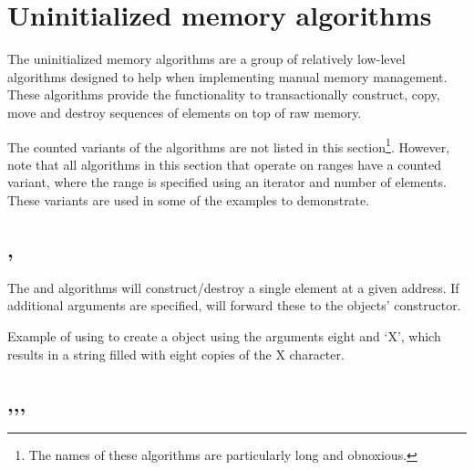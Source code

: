 \section{Uninitialized memory algorithms}

The uninitialized memory algorithms are a group of relatively low-level algorithms designed to help when implementing manual memory management. These algorithms provide the functionality to transactionally construct, copy, move and destroy sequences of elements on top of raw memory.


The counted variants of the algorithms are not listed in this section\footnote{The names of these algorithms are particularly long and obnoxious.}. However, note that all algorithms in this section that operate on ranges have a counted variant, where the range is specified using an iterator and number of elements. These variants are used in some of the examples to demonstrate.

\subsection{\texorpdfstring{, }{\texttt{std::construct\_at}, \texttt{std::destroy\_at}}}

The  and  algorithms will construct/destroy a single element at a given address. If additional arguments are specified,  will forward these to the objects’ constructor.


\begin{box-note}
\footnotesize Example of using  to create a  object using the arguments eight and ‘X’, which results in a string filled with eight copies of the X character.
\tcblower
{}
\end{box-note}

\subsection{\texorpdfstring{,\newline{},\newline{}, \newline{}}{\texttt{std::uninitialized\_default\_construct},\newline\texttt{std::uninitialized\_value\_construct},\newline\texttt{std::uninitialized\_fill}, \newline\texttt{std::destroy}}}

